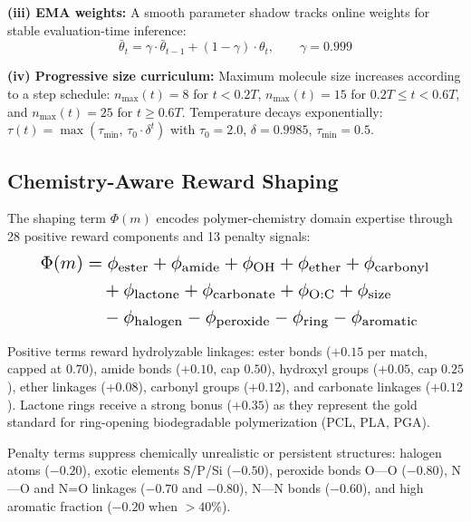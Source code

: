 \documentclass[twocolumn,10pt]{article}
\begin{document}
\textbf{(iii) EMA weights:} A smooth parameter shadow tracks online weights for stable evaluation-time inference:
\begin{equation}
\bar{\theta}_t = \gamma \cdot \bar{\theta}_{t-1} + (1 - \gamma) \cdot \theta_t, \qquad \gamma = 0.999
\end{equation}

\textbf{(iv) Progressive size curriculum:} Maximum molecule size increases according to a step schedule: $n_\text{max}(t) = 8$ for $t < 0.2T$, $n_\text{max}(t) = 15$ for $0.2T \leq t < 0.6T$, and $n_\text{max}(t) = 25$ for $t \geq 0.6T$. Temperature decays exponentially: $\tau(t) = \max(\tau_\text{min},\, \tau_0 \cdot \delta^t)$ with $\tau_0 = 2.0$, $\delta = 0.9985$, $\tau_\text{min} = 0.5$.

\subsection{Chemistry-Aware Reward Shaping}

The shaping term $\Phi(m)$ encodes polymer-chemistry domain expertise through 28 positive reward components and 13 penalty signals:
\begin{equation}
\resizebox{0.89\linewidth}{!}{$
\begin{aligned}
\Phi(m) &= \phi_\text{ester} + \phi_\text{amide} + \phi_\text{OH} + \phi_\text{ether} + \phi_\text{carbonyl} \\
&\quad + \phi_\text{lactone} + \phi_\text{carbonate} + \phi_\text{O:C} + \phi_\text{size} \\
&\quad - \phi_\text{halogen} - \phi_\text{peroxide} - \phi_\text{ring} - \phi_\text{aromatic}
\end{aligned}
$}
\end{equation}

Positive terms reward hydrolyzable linkages: ester bonds ($+0.15$ per match, capped at $0.70$), amide bonds ($+0.10$, cap $0.50$), hydroxyl groups ($+0.05$, cap $0.25$), ether linkages ($+0.08$), carbonyl groups ($+0.12$), and carbonate linkages ($+0.12$). Lactone rings receive a strong bonus ($+0.35$) as they represent the gold standard for ring-opening biodegradable polymerization (PCL, PLA, PGA).

Penalty terms suppress chemically unrealistic or persistent structures: halogen atoms ($-0.20$), exotic elements S/P/Si ($-0.50$), peroxide bonds O---O ($-0.80$), N---O and N=O linkages ($-0.70$ and $-0.80$), N---N bonds ($-0.60$), and high aromatic fraction ($-0.20$ when $> 40\%$).
\end{document}
